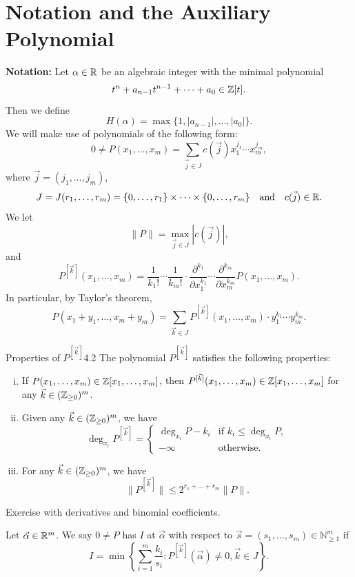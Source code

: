 \documentclass{Vorlesungstemplate_English} %
\renewcommand{\N}{\mathbb{N}_{\geq 1}}
\begin{document}
\section{Notation and the Auxiliary Polynomial}
\noindent\textbf{Notation:} Let $\alpha \in \mathbb{R}$ be an algebraic integer with the minimal polynomial
\[ t^n + a_{n-1}t^{n-1} + \dots + a_0 \in \mathbb{Z}[t].\]
Then we define
\[ H(\alpha) = \max\{ 1, |a_{n-1}|, \dots, |a_0|\}.\]
We will make use of polynomials of the following form:
\[ 0 \neq P(x_1, \dots, x_m) = \sum_{\vec j \in J}c(\vec j)x_1^{j_1}\cdots x_m^{j_m},\]
where $\vec j = (j_1, \dots, j_m)$,
\[ J = J(r_1, \dots, r_m) = \{ 0, \dots, r_1\} \times \dots \times \{ 0, \dots, r_m\} \quad \text{and} \quad c(\vec j) \in \mathbb{R}.\]
We let
\[ \|P\| = \max_{\vec j \in J}|c(\vec j)|,\]
and
\[ P^{[\vec k]}(x_1, \dots, x_m) = \frac{1}{k_1!}\cdots\frac{1}{k_m!}\cdot\frac{\partial^{k_1}}{\partial x_1^{k_1}}\cdots\frac{\partial^{k_m}}{\partial x_m^{k_m}}P(x_1, \dots, x_m).\]
In particular, by Taylor's theorem,
\[ P(x_1+y_1, \dots, x_m+y_m) = \sum_{\vec k \in J}P^{[\vec k]}(x_1, \dots, x_m)\cdot y_1^{k_1}\cdots y_m^{k_m}.\]
\begin{lemma}{Properties of $P^{[\vec k]}$}{4.2}
  The polynomial $P^{[\vec k]}$ satisfies the following properties:
  \begin{enumerate}[(i)]
    \item If $P(x_1, \dots, x_m) \in \mathbb{Z}[x_1, \dots, x_m]$, then $P^{[\vec k]}(x_1, \dots, x_m) \in \mathbb{Z}[x_1, \dots, x_m]$ for any $\vec k \in (\mathbb{Z}_{\geq 0})^m$.
    \item Given any $\vec k \in (\mathbb{Z}_{\geq 0})^m$, we have
    \[ \deg_{x_i}P^{[\vec k]} = \begin{cases} \deg_{x_i}P - k_i & \text{if } k_i \leq \deg_{x_i}P, \\ -\infty & \text{otherwise.}\end{cases}\]
    \item For any $\vec k \in (\mathbb{Z}_{\geq 0})^m$, we have
    \[ \|P^{[\vec k]}\| \leq 2^{r_1 + \dots + r_m}\|P\|.\]
  \end{enumerate}
\end{lemma}
\begin{pf}
  Exercise with derivatives and binomial coefficients.
\end{pf}
\noindent Let $\vec\alpha \in \mathbb{R}^m$. We say $0 \neq P$ has  $I$ at $\vec\alpha$ with respect to $\vec s = (s_1, \dots, s_m) \in \N^m$ if
\[ I = \min\left\{ \sum_{i=1}^m\frac{k_i}{s_i} : P^{[\vec k]}(\vec\alpha) \neq 0, \vec k \in J\right\}.\]
\end{document}
